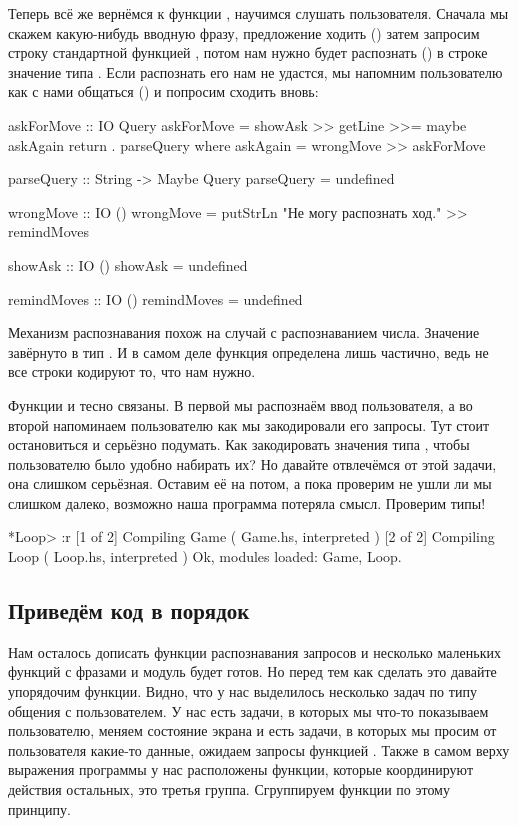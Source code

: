 Теперь всё же вернёмся к функции , научимся
слушать пользователя. Сначала мы скажем какую-нибудь вводную
фразу, предложение ходить () затем запросим
строку стандартной функцией , потом нам нужно будет
распознать () в строке значение типа . 
Если распознать его нам не удастся, мы напомним пользователю 
как с нами общаться () и попросим сходить вновь:


\begin{code}
askForMove :: IO Query
askForMove = showAsk >>
    getLine >>= maybe askAgain return . parseQuery 
    where askAgain = wrongMove >> askForMove


parseQuery :: String -> Maybe Query
parseQuery = undefined

wrongMove :: IO ()
wrongMove = putStrLn "Не могу распознать ход." >> remindMoves

showAsk :: IO ()
showAsk = undefined

remindMoves :: IO ()
remindMoves = undefined
\end{code}

Механизм распознавания похож на случай с распознаванием числа.
Значение завёрнуто в тип . И в самом деле функция
определена лишь частично, ведь не все строки кодируют то, что
нам нужно. 

Функции  и  тесно связаны.
В первой мы распознаём ввод пользователя, а во второй 
напоминаем пользователю как мы закодировали его запросы.
Тут стоит остановиться и серьёзно подумать. Как закодировать
значения типа , чтобы пользователю было удобно набирать их?
Но давайте отвлечёмся от этой задачи, она слишком серьёзная.
Оставим её на потом, а пока проверим не ушли ли мы слишком
далеко, возможно наша программа потеряла смысл. Проверим типы!

\begin{code}
*Loop> :r
[1 of 2] Compiling Game             ( Game.hs, interpreted )
[2 of 2] Compiling Loop             ( Loop.hs, interpreted )
Ok, modules loaded: Game, Loop.
\end{code}

\subsection{Приведём код в порядок}

Нам осталось дописать функции распознавания запросов
и несколько маленьких функций с фразами
и модуль  будет готов. Но перед тем
как сделать это давайте упорядочим функции. 
Видно, что у нас выделилось несколько задач по
типу общения с пользователем. У нас есть задачи,
в которых мы что-то показываем пользователю, меняем
состояние экрана и есть задачи, в которых мы просим
от пользователя какие-то данные, ожидаем запросы
функцией . Также в самом верху выражения
программы у нас расположены функции, которые координируют
действия остальных, это третья группа. Сгруппируем функции по этому
принципу.

